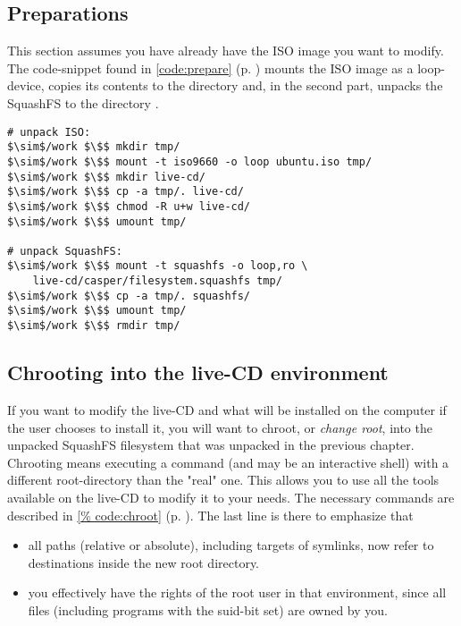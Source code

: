 \subsection{Preparations}
This section assumes you have already have the ISO image you want to modify. The
code-snippet found in \lstlistingname{} \ref{code:prepare} (p. \pageref{code:prepare})
mounts the ISO image  as a loop-device, copies its
contents to the directory  and, in the second part, unpacks
the SquashFS to the directory . 
\begin{lstlisting}[caption={Unpacking the ISO and SquashFS filesystems},float=ht,label=code:prepare]
# unpack ISO:
$\sim$/work $\$$ mkdir tmp/
$\sim$/work $\$$ mount -t iso9660 -o loop ubuntu.iso tmp/
$\sim$/work $\$$ mkdir live-cd/
$\sim$/work $\$$ cp -a tmp/. live-cd/
$\sim$/work $\$$ chmod -R u+w live-cd/
$\sim$/work $\$$ umount tmp/

# unpack SquashFS:
$\sim$/work $\$$ mount -t squashfs -o loop,ro \
	live-cd/casper/filesystem.squashfs tmp/
$\sim$/work $\$$ cp -a tmp/. squashfs/
$\sim$/work $\$$ umount tmp/
$\sim$/work $\$$ rmdir tmp/
\end{lstlisting}

\subsection{Chrooting into the live-CD environment}
If you want to modify the live-CD and what will be installed on the
computer if the user chooses to install it, you will want to chroot, or
\emph{change root}, into the unpacked SquashFS filesystem that was unpacked in
the previous chapter. Chrooting means executing a command (and may be an
interactive shell) with a different root-directory than the "real" one. This
allows you to use all the tools available on the live-CD to modify it to your
needs. The necessary commands are described in \lstlistingname{} \ref{%
code:chroot} (p. \pageref{code:chroot}). The last line is there to emphasize
that 
\begin{itemize}
\item all paths (relative or absolute), including targets of symlinks, now refer
to destinations inside the new root directory.
\item you effectively have the rights of the root user in that environment,
since all files (including programs with the suid-bit set) are owned by you.
\end{itemize}

